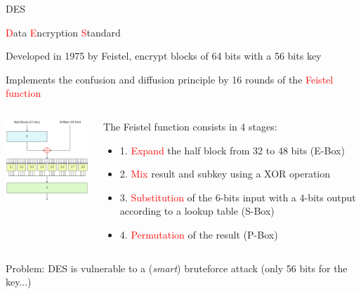\begin{frame}{DES}

\textcolor{red}{D}ata \textcolor{red}{E}ncryption \textcolor{red}{S}tandard

Developed in 1975 by Feistel, encrypt blocks of 64 bits with a 56 bits key

Implements the confusion and diffusion principle by 16 rounds of the \textcolor{red}{Feistel function}

\medskip

  \begin{columns}
  \begin{column}{0.5\textwidth}
  
    \centerline{\includegraphics[width=5cm]{img/DES.png}}

  \end{column}
  \begin{column}{0.5\textwidth}
  
  The Feistel function consists in 4 stages:
  
  \begin{itemize}
    \item 1. \textcolor{red}{Expand} the half block from 32 to 48 bits (E-Box)
    \item 2. \textcolor{red}{Mix} result and subkey using a XOR operation
    \item 3. \textcolor{red}{Substitution} of the 6-bits input with a 4-bits output according to a lookup table (S-Box)
    \item 4. \textcolor{red}{Permutation} of the result (P-Box)
  \end{itemize}
    
  \end{column}
  \end{columns}

  \medskip

  Problem: DES is vulnerable to a (\textit{smart}) bruteforce attack (only 56 bits for the key...)
  
\end{frame}

